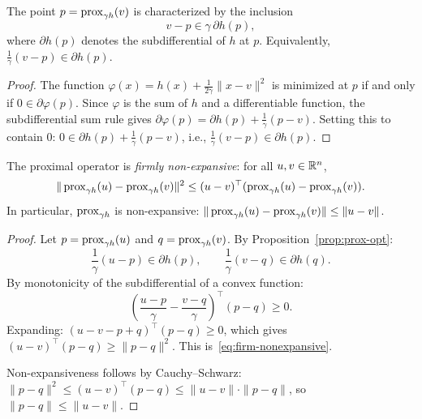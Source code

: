 \documentclass[11pt,a4paper]{article}
\begin{document}
\begin{proposition}%
\label{prop:prox-opt}
The point $p = \operatorname{prox}_{\gamma h}(v)$ is characterized by the inclusion
\begin{equation}\label{eq:prox-opt}
  v - p \in \gamma\, \partial h(p),
\end{equation}
where $\partial h(p)$ denotes the subdifferential of $h$ at $p$.
Equivalently, $\frac{1}{\gamma}(v - p) \in \partial h(p)$.
\end{proposition}

\begin{proof}
The function $\varphi(x) = h(x) + \frac{1}{2\gamma}\|x - v\|^2$ is
minimized at $p$ if and only if $0 \in \partial \varphi(p)$. Since
$\varphi$ is the sum of $h$ and a differentiable function, the
subdifferential sum rule gives
$\partial \varphi(p) = \partial h(p) + \frac{1}{\gamma}(p - v)$.
Setting this to contain $0$: $0 \in \partial h(p) + \frac{1}{\gamma}(p - v)$,
i.e., $\frac{1}{\gamma}(v - p) \in \partial h(p)$.
\end{proof}

\begin{proposition}\label{prop:prox-nonexpansive}
The proximal operator is \emph{firmly non-expansive}: for all
$u, v \in \mathbb{R}^n$,
\begin{equation}\label{eq:firm-nonexpansive}
  \|\operatorname{prox}_{\gamma h}(u) - \operatorname{prox}_{\gamma h}(v)\|^2
  \le (u - v)^\top(\operatorname{prox}_{\gamma h}(u) - \operatorname{prox}_{\gamma h}(v)).
\end{equation}
In particular, $\operatorname{prox}_{\gamma h}$ is non-expansive:
$\|\operatorname{prox}_{\gamma h}(u) - \operatorname{prox}_{\gamma h}(v)\| \le \|u - v\|$.
\end{proposition}

\begin{proof}
Let $p = \operatorname{prox}_{\gamma h}(u)$ and $q = \operatorname{prox}_{\gamma h}(v)$. By
Proposition~\ref{prop:prox-opt}:
\[
  \frac{1}{\gamma}(u - p) \in \partial h(p), \qquad
  \frac{1}{\gamma}(v - q) \in \partial h(q).
\]
By monotonicity of the subdifferential of a convex function:
\[
  \left(\frac{u - p}{\gamma} - \frac{v - q}{\gamma}\right)^\top
  (p - q) \ge 0.
\]
Expanding:
$(u - v - p + q)^\top(p - q) \ge 0$,
which gives $(u - v)^\top(p - q) \ge \|p - q\|^2$.
This is~\eqref{eq:firm-nonexpansive}.

Non-expansiveness follows by Cauchy--Schwarz:
$\|p - q\|^2 \le (u - v)^\top(p - q) \le \|u - v\| \cdot \|p - q\|$,
so $\|p - q\| \le \|u - v\|$.
\end{proof}
\end{document}
